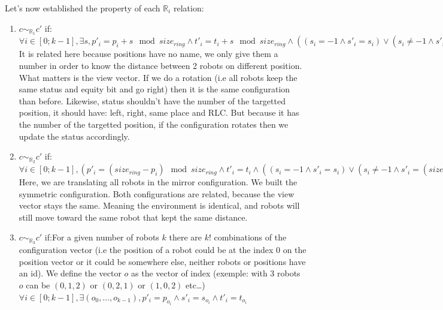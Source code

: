 \documentclass{article}
\begin{document}
Let's now established the property of each $\mathbb{R}_{i}$ relation:
\begin{enumerate}
    \item $c \sim_{\mathbb{R}_{1}} c'$ if:\newline $\forall i \in [0;k-1], \exists s , p'_{i} = p_{i} + s \mod{size_{ring}} \land t'_{i} = t_{i} + s \mod{size_{ring}} \land  ( (s_{i} = -1 \land s'_{i} = s_{i}) \lor  (s_{i} \not= -1 \land s'_{i} = s_{i} + s \mod{size_{ring}}))$\newline It is related here because positions have no name, we only give them a number in order to know the distance between 2 robots on different position. What matters is the view vector. If we do a rotation  (i.e all robots keep the same status and equity bit and go right) then it is the same configuration than before. Likewise, status shouldn't have the number of the targetted position, it should have: left, right, same place and RLC. But because it has the number of the targetted position, if the configuration rotates then we update the status accordingly.
    
    \item $c \sim_{\mathbb{R}_{2}} c'$ if:\newline $\forall i \in [0; k-1],  (p'_{i} =  (size_{ring} - p_{i})\mod{size_{ring}} \land t'_{i} = t_{i} \land  ( (s_{i} = -1 \land s'_{i} = s_{i}) \lor  (s_{i} \not= -1 \land s'_{i} =  (size_{ring} - s_{i})\mod{size_{ring}})) \bigvee  (p'_{i} = p_{i} \land s'_{i} = s_{i} \land t'_{i} = t_{i}))$\newline Here, we are translating all robots in the mirror configuration. We built the symmetric configuration. Both configurations are related, because the view vector stays the same. Meaning the environment is identical, and robots will still move toward the same robot that kept the same distance.
    
    \item $c \sim_{\mathbb{R}_{3}} c'$ if:\newline For a given number of robots $k$ there are $k!$ combinations of the configuration vector  (i.e the position of a robot could be at the index 0 on the position vector or it could be somewhere else, neither robots or positions have an id). We define the vector $o$ as the vector of index  (exemple: with 3 robots $o$ can be $ (0, 1, 2)$ or $ (0, 2, 1)$ or $ (1, 0, 2)$ etc\ldots )\newline $\forall i \in [0;k-1], \exists  (o_{0},\dots, o_{k-1}), p'_{i} = p_{o_{i}} \land s'_{i} = s_{o_{i}} \land t'_{i} = t_{o_{i}} $
\end{enumerate}
\end{document}
